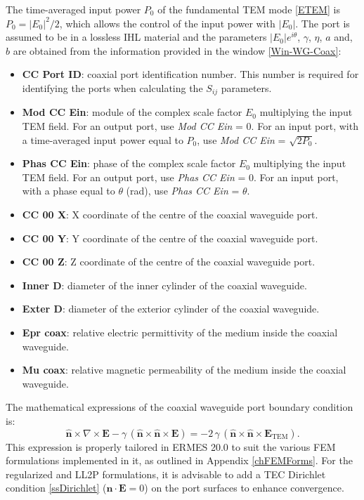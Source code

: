 The time-averaged input power $P_{0}$ of the fundamental TEM mode \eqref{ETEM} is $P_{0} = |E_{0}|^2/2$, which allows the control of the input power with $|E_{0}|$. The port is assumed to be in a lossless IHL material and the parameters $|E_{0}|e^{i\theta}$, $\gamma$, $\eta$, $a$ and, $b$ are obtained from the information provided in the window \ref{Win-WG-Coax}:
\begin{itemize}\itemsep0em 
	\item \textbf{CC Port ID}: coaxial port identification number. This number is required for identifying the ports when calculating the $S_{ij}$ parameters. 
	\\
	\item \textbf{Mod CC Ein}: module of the complex scale factor $E_{0}$ multiplying the input TEM field. For an output port, use \textit{Mod CC Ein} = 0. For an input port, with a time-averaged input power equal to $P_{0}$,
	use \textit{Mod CC Ein} = $\sqrt{2P_{0}}$.
	\item \textbf{Phas CC Ein}: phase of the complex scale factor $E_{0}$ multiplying the input TEM field. For an output port, use \textit{Phas CC Ein} = 0. For an input port, with a phase equal to $\theta$ (rad), use \textit{Phas CC Ein} = $\theta$.
	\\
	\item \textbf{CC 00 X}: X coordinate of the centre of the coaxial waveguide port.
	\item \textbf{CC 00 Y}: Y coordinate of the centre of the coaxial waveguide port.
	\item \textbf{CC 00 Z}: Z coordinate of the centre of the coaxial waveguide port.
	\\
	\item \textbf{Inner D}: diameter of the inner cylinder of the coaxial waveguide.
	\item \textbf{Exter D}: diameter of the exterior cylinder of the coaxial waveguide.
	\\
	\item \textbf{Epr coax}: relative electric permittivity of the medium inside the coaxial waveguide.
	\item \textbf{Mu coax}: relative magnetic permeability of the medium inside the coaxial waveguide.
\end{itemize}
The mathematical expressions of the coaxial waveguide port boundary condition is:
\begin{equation}\label{CCRCExpanded}
	\mathbf{\hat{n}}\times\nabla\times\mathbf{E} - \gamma\,(\mathbf{\hat{n}}\times\mathbf{\hat{n}}\times\mathbf{E}) = -2\,\gamma\,(\mathbf{\hat{n}}\times\mathbf{\hat{n}}\times\mathbf{E}_{\text{TEM}}).
\end{equation}
This expression is properly tailored in ERMES 20.0 to suit the various FEM formulations implemented in it, as outlined in Appendix \ref{chFEMForms}. For the regularized and LL2P formulations, it is advisable to add a TEC Dirichlet condition \ref{ssDirichlet} ($\mathbf{\hat{n}}\cdot\mathbf{E} = 0$) on the port surfaces to enhance convergence.

